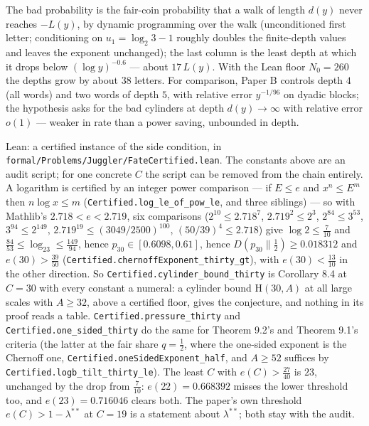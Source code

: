 \documentclass[11pt,a4paper]{article}
\begin{document}
\endgroup

The bad probability is the fair-coin probability that a walk of length
\(d(y)\) never reaches \(-L(y)\), by dynamic programming over the walk
(unconditioned first letter; conditioning on \(u_1=\log_2 3-1\) roughly
doubles the finite-depth values and leaves the exponent unchanged); the
last column is the least depth at which it drops below
\((\log y)^{-0.6}\) --- about \(17\,L(y)\). With the Lean floor
\(N_0=260\) the depths grow by about \(38\) letters. For comparison,
Paper B controls depth \(4\) (all words) and two words of depth \(5\),
with relative error \(y^{-1/96}\) on dyadic blocks; the hypothesis asks
for the bad cylinders at depth \(d(y)\to\infty\) with relative error
\(o(1)\) --- weaker in rate than a power saving, unbounded in depth.

Lean: a certified instance of the side condition, in
\texttt{\nolinkurl{formal/Problems/Juggler/FateCertified.lean}}. The
constants above are an audit script; for one concrete \(C\) the script
can be removed from the chain entirely. A logarithm is certified by an
integer power comparison --- if \(E\le e\) and \(x^n\le E^m\) then
\(n\log x\le m\) (\texttt{\nolinkurl{Certified.log_le_of_pow_le}}, and
three siblings) --- so with Mathlib's \(2.718<e<2.719\), six comparisons
(\(2^{10}\le2.718^{7}\), \(2.719^{2}\le2^{3}\), \(2^{84}\le3^{53}\),
\(3^{94}\le2^{149}\), \(2.719^{19}\le(3049/2500)^{100}\),
\((50/39)^{4}\le2.718\)) give \(\log 2\le\tfrac7{10}\) and
\(\tfrac{84}{53}\le\log_23\le\tfrac{149}{94}\), hence
\(p_{30}\in[0.6098,0.61]\), hence \(D(p_{30}\|\tfrac12)\ge0.018312\) and
\(e(30)>\tfrac{39}{50}\)
(\texttt{\nolinkurl{Certified.chernoffExponent_thirty_gt}}), with
\(e(30)<\tfrac{13}{10}\) in the other direction. So
\texttt{\nolinkurl{Certified.cylinder_bound_thirty}} is Corollary 8.4 at
\(C=30\) with every constant a numeral: a cylinder bound
\(\mathrm H(30,A)\) at all large scales with \(A\ge32\), above a
certified floor, gives the conjecture, and nothing in its proof reads a
table. \texttt{\nolinkurl{Certified.pressure_thirty}} and
\texttt{\nolinkurl{Certified.one_sided_thirty}} do the same for Theorem
9.2's and Theorem 9.1's criteria (the latter at the fair share
\(q=\tfrac12\), where the one-sided exponent is the Chernoff one,
\texttt{\nolinkurl{Certified.oneSidedExponent_half}}, and \(A\ge52\)
suffices by \texttt{\nolinkurl{Certified.logb_tilt_thirty_le}}). The
least \(C\) with \(e(C)>\tfrac{27}{40}\) is \(23\), unchanged by the
drop from \(\tfrac7{10}\): \(e(22)=0.668392\) misses the lower threshold
too, and \(e(23)=0.716046\) clears both. The paper's own threshold
\(e(C)>1-\lambda^{**}\) at \(C=19\) is a statement about
\(\lambda^{**}\); both stay with the audit.
\end{document}

